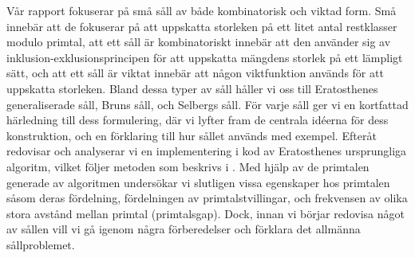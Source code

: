 Vår rapport fokuserar på små såll av både kombinatorisk och viktad form. 
Små innebär att de fokuserar på att uppskatta storleken på ett litet antal restklasser modulo primtal, att ett såll är kombinatoriskt innebär att den använder sig av inklusion-exklusionsprincipen för att uppskatta mängdens storlek på ett lämpligt sätt, och att ett såll är viktat innebär att någon viktfunktion används för att uppskatta storleken. 
Bland dessa typer av såll håller vi oss till Eratosthenes generaliserade såll, Bruns såll, och Selbergs såll. 
För varje såll ger vi en kortfattad härledning till dess formulering, där vi lyfter fram de centrala idéerna för dess konstruktion, och en förklaring till hur sållet används med exempel. 
Efteråt redovisar och analyserar vi en implementering i kod av Eratosthenes ursprungliga algoritm, vilket följer metoden som beskrivs i \cite{HaraldSieve}.
Med hjälp av de primtalen generade av algoritmen undersökar vi slutligen vissa egenskaper hos primtalen såsom deras fördelning, fördelningen av primtalstvillingar, och frekvensen av olika stora avstånd mellan primtal (primtalsgap).
Dock, innan vi börjar redovisa något av sållen vill vi gå igenom några förberedelser och förklara det allmänna sållproblemet.